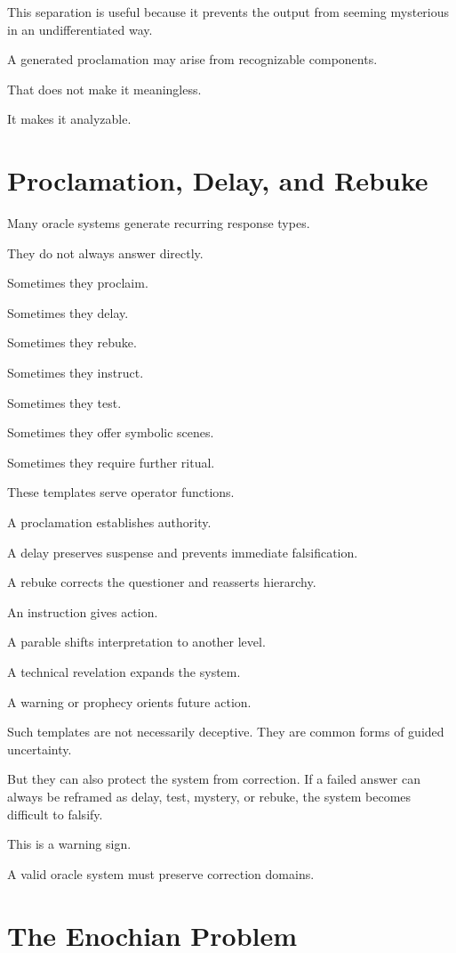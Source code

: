 \documentclass[11pt]{book}
\begin{document}
This separation is useful because it prevents the output from seeming mysterious in an undifferentiated way.

A generated proclamation may arise from recognizable components.

That does not make it meaningless.

It makes it analyzable.

\section{Proclamation, Delay, and Rebuke}

Many oracle systems generate recurring response types.

They do not always answer directly.

Sometimes they proclaim.

Sometimes they delay.

Sometimes they rebuke.

Sometimes they instruct.

Sometimes they test.

Sometimes they offer symbolic scenes.

Sometimes they require further ritual.

These templates serve operator functions.

A proclamation establishes authority.

A delay preserves suspense and prevents immediate falsification.

A rebuke corrects the questioner and reasserts hierarchy.

An instruction gives action.

A parable shifts interpretation to another level.

A technical revelation expands the system.

A warning or prophecy orients future action.

Such templates are not necessarily deceptive. They are common forms of guided uncertainty.

But they can also protect the system from correction. If a failed answer can always be reframed as delay, test, mystery, or rebuke, the system becomes difficult to falsify.

This is a warning sign.

A valid oracle system must preserve correction domains.

\section{The Enochian Problem}
\end{document}
